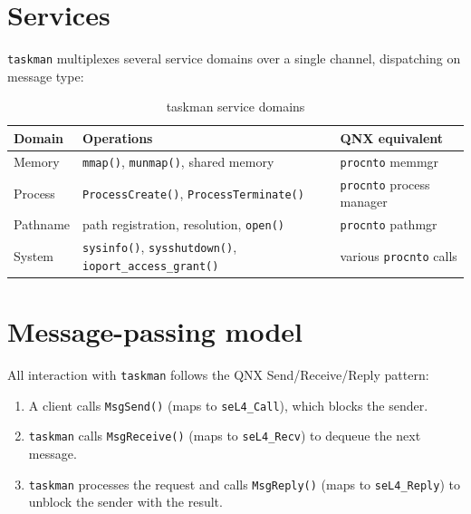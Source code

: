 \section{Services}

\texttt{taskman} multiplexes several service domains over a single
channel, dispatching on message type:

\begin{table}[ht]
\centering
\begin{tabular}{@{}lll@{}}
    \toprule
    \textbf{Domain}   & \textbf{Operations}
                       & \textbf{QNX equivalent} \\
    \midrule
    Memory             & \texttt{mmap()}, \texttt{munmap()}, shared memory
                       & \texttt{procnto} memmgr \\
    Process            & \texttt{ProcessCreate()}, \texttt{ProcessTerminate()}
                       & \texttt{procnto} process manager \\
    Pathname           & path registration, resolution, \texttt{open()}
                       & \texttt{procnto} pathmgr \\
    System             & \texttt{sysinfo()}, \texttt{sysshutdown()},
                         \texttt{ioport\_access\_grant()}
                       & various \texttt{procnto} calls \\
    \bottomrule
\end{tabular}
\caption{taskman service domains}
\label{tab:taskman-services}
\end{table}

\section{Message-passing model}

All interaction with \texttt{taskman} follows the QNX
Send/Receive/Reply pattern:

\begin{enumerate}
    \item A client calls \texttt{MsgSend()} (maps to \texttt{seL4\_Call}),
          which blocks the sender.
    \item \texttt{taskman} calls \texttt{MsgReceive()} (maps to
          \texttt{seL4\_Recv}) to dequeue the next message.
    \item \texttt{taskman} processes the request and calls
          \texttt{MsgReply()} (maps to \texttt{seL4\_Reply}) to unblock
          the sender with the result.
\end{enumerate}

